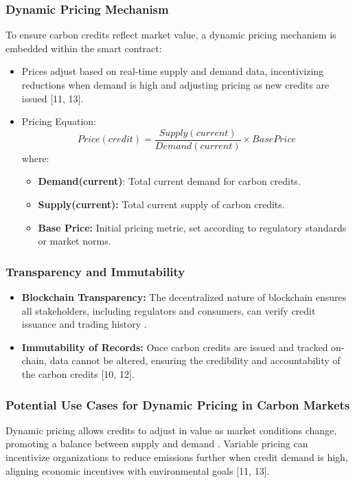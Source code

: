 \documentclass[preprint,12pt]{elsarticle}
\begin{document}
\subsubsection{Dynamic Pricing Mechanism}
To ensure carbon credits reflect market value, a dynamic pricing mechanism is embedded within the smart contract:
\begin{itemize}
    \item Prices adjust based on real-time supply and demand data, incentivizing reductions when demand is high and adjusting pricing as new credits are issued [11, 13].
    \item Pricing Equation: 
	\[Price(credit)=\frac{Supply(current)}{Demand(current)}\times Base Price\]
where:
\begin{itemize}
    \item \textbf{Demand(current)}: Total current demand for carbon credits.
    \item \textbf{Supply(current):} Total current supply of carbon credits.
    \item \textbf{Base Price:} Initial pricing metric, set according to regulatory standards or market norms.
\end{itemize}
\end{itemize}
\subsubsection{Transparency and Immutability}
\begin{itemize}
    \item \textbf{Blockchain Transparency:} The decentralized nature of blockchain ensures all stakeholders, including regulators and consumers, can verify credit issuance and trading history \citep{tapscott2016blockchain}.
    \item \textbf{Immutability of Records:} Once carbon credits are issued and tracked on-chain, data cannot be altered, ensuring the credibility and accountability of the carbon credits [10, 12].
\end{itemize}
\subsubsection{Potential Use Cases for Dynamic Pricing in Carbon Markets}
Dynamic pricing allows credits to adjust in value as market conditions change, promoting a balance between supply and demand \citep{parikh2022smart}. Variable pricing can incentivize organizations to reduce emissions further when credit demand is high, aligning economic incentives with environmental goals [11, 13].
\end{document}
